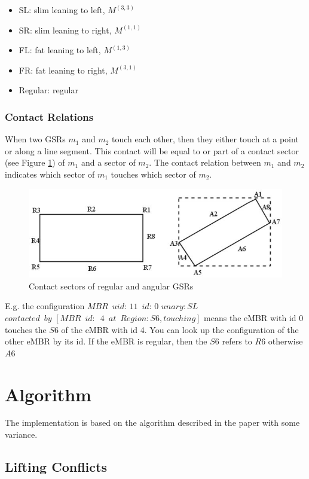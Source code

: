 \documentclass{article}
\begin{document}
\begin{itemize}
\item SL: slim leaning to left, $M^{(3,3)}$
\item SR: slim leaning to right, $M^{(1,1)}$
\item FL: fat leaning to left, $M^{(1,3)}$
\item FR: fat leaning to right,  $M^{(3,1)}$
\item Regular: regular
\end{itemize}
\subsubsection{Contact Relations}
When two GSRs $m_1$ and $m_2$ touch each other, then they either touch at a point or along a line segment. This contact will be equal to or part of a contact sector (see Figure \ref{sector}) of $m_1$ and a sector of $m_2$.
The contact relation between $m_1$ and $m_2$ indicates which sector of $m_1$ touches which sector of $m_2$.  
\begin{figure}[h!]
\centering\includegraphics[scale=0.35]{sectors.png}\caption{Contact sectors of regular and angular GSRs}
\label{sector}
\end{figure}
E.g. the configuration 
 ${MBR\,\,\, uid:\,11 \,\,\,id:\,0}$ $unary: SL$ $contacted\,\,\, by\,\, [ MBR\,\,\,id:\,\,\,4\,\,\,at\,\,\,Region: S6, touching ]$ means the eMBR with id 0 touches the $S6$ of the eMBR with id 4. You can look up the configuration of  the other eMBR by its id. If the eMBR is regular, then the $S6$ refers to $R6$ otherwise $A6$
\section{Algorithm}
The implementation is based on the algorithm described in the paper with some variance. 

\subsection{Lifting Conflicts}\label{conflict}
\end{document}
